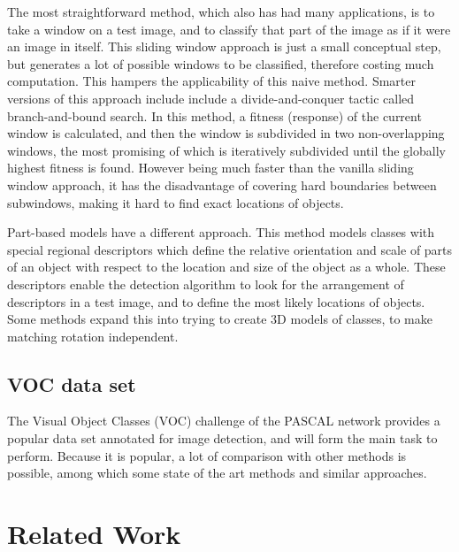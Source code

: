 \documentclass[a4paper,10pt]{article}
\begin{document}
The most straightforward method, which also has had many applications, is to take a window on a test image, and to classify that part of the image as if it were an image in itself. This sliding window approach  is just a small conceptual step, but generates a lot of possible windows to be classified, therefore costing much computation. This hampers the applicability of this naive method. Smarter versions of this approach include include a divide-and-conquer tactic called branch-and-bound search. \cite{lampert2008beyond} In this method, a fitness (response) of the current window is calculated, and then the window is subdivided in two non-overlapping windows, the most promising of which is iteratively subdivided until the globally highest fitness is found. However being much faster than the vanilla sliding window approach, it has the disadvantage of covering hard boundaries between subwindows, making it hard to find exact locations of objects.

Part-based models have a different approach. This method models classes with special regional descriptors which define the relative orientation and scale of parts of an object with respect to the location and size of the object as a whole. \cite{leibe2004combined, chum2007exemplar, felzenszwalb2010object} These descriptors enable the detection algorithm to look for the arrangement of descriptors in a test image, and to define the most likely locations of objects. Some methods expand this into trying to create 3D models of classes, to make matching rotation independent. 

\subsection{VOC data set} %
\label{sub:voc_data_set}
The Visual Object Classes (VOC) challenge of the PASCAL network  provides a popular data set annotated for image detection, and will form the main task to perform. Because it is popular, a lot of comparison with other methods is possible, among which some state of the art methods and similar approaches.



\section{Related Work} %
\label{sec:related_work}
\end{document}

